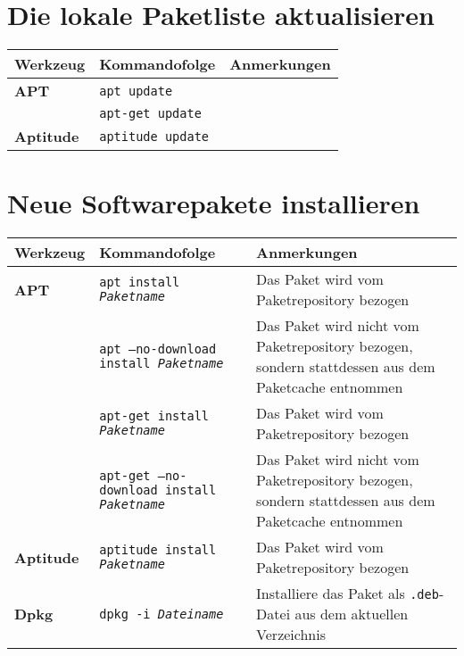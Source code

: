 \documentclass[10pt]{article}
\begin{document}
\cheatsheet

\section{Die lokale Paketliste aktualisieren}

\begin{tabular}{ p{3.5cm} p{9cm} p{11cm}}
  \hline
  \rowcolor{Gray}
  \textbf{Werkzeug} & \textbf{Kommandofolge} & \textbf{Anmerkungen} \\
  \hline 
  \textbf{APT} & \texttt{apt update} & \\
  \rowcolor{Gray}
  & \texttt{apt-get update} & \\
  \textbf{Aptitude} & \texttt{aptitude update} & \\
  \hline 
\end{tabular}

\section{Neue Softwarepakete installieren}
\begin{tabular}{ p{3.5cm} p{9cm} p{11cm}}
  \hline
  \rowcolor{Gray}
  \textbf{Werkzeug} & \textbf{Kommandofolge} & \textbf{Anmerkungen} \\
  \hline 
  \textbf{APT} & \texttt{apt install \textit{Paketname}} & Das Paket wird vom Paketrepository bezogen \\
  \rowcolor{Gray}
   & \texttt{apt --no-download install \textit{Paketname}} & Das Paket wird nicht vom Paketrepository bezogen, sondern statt\-dessen aus dem Paketcache entnommen \\ 
   & \texttt{apt-get install \textit{Paketname}} & Das Paket wird vom Paketrepository bezogen \\
  \rowcolor{Gray}
   & \texttt{apt-get --no-download install \textit{Paketname}} & Das Paket wird nicht vom Paketrepository bezogen, sondern statt\-dessen aus dem Paketcache entnommen \\
  \textbf{Aptitude} & \texttt{aptitude install \textit{Paketname}} & Das Paket wird vom Paketrepository bezogen \\
  \rowcolor{Gray}
  \textbf{Dpkg} & \texttt{dpkg -i \textit{Dateiname}} & Installiere das Paket als \texttt{.deb}-Datei aus dem aktuellen Verzeichnis \\
  \hline
\end{tabular}
\end{document}
